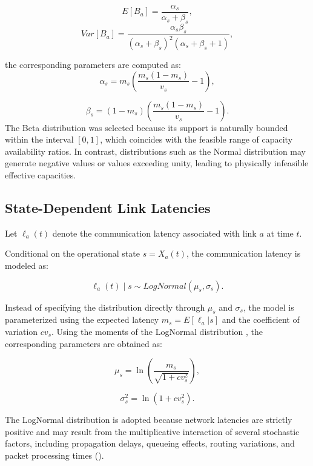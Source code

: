 \documentclass[a4paper,fleqn]{cas-dc}
\begin{document}
\[ E[B_a]=\frac{\alpha_s}{\alpha_s+\beta_s}, \] \[ Var[B_a] = \frac{\alpha_s\beta_s} {(\alpha_s+\beta_s)^2 (\alpha_s+\beta_s+1)}, 
\] 

the corresponding parameters are computed as:
\[ \alpha_s = m_s \left( \frac{m_s(1-m_s)}{v_s}-1 \right), 
\] 

\[ \beta_s = (1-m_s) \left( \frac{m_s(1-m_s)}{v_s}-1 \right). 
\]
The Beta distribution was selected because its support is naturally bounded within the interval \([0,1]\), which coincides with the feasible range of capacity availability ratios. In contrast, distributions such as the Normal distribution may generate negative values or values exceeding unity, leading to physically infeasible effective capacities.

\subsection*{State-Dependent Link Latencies}

Let \(\ell_a(t)\) denote the communication latency associated with link \(a\) at time \(t\). 

Conditional on the operational state \(s=X_a(t)\), the communication latency is modeled as:

\begin{equation} 
\ell_a(t)\mid s 
\sim LogNormal(\mu_s,\sigma_s). 
\end{equation} 

Instead of specifying the distribution directly through \(\mu_s\) and \(\sigma_s\), the model is parameterized using the expected latency \(m_s=E[\ell_a|s]\) and the coefficient of variation \(cv_s\). Using the moments of the LogNormal distribution \citep{Johnson1994}, the corresponding parameters are obtained as:

\begin{equation} 
\mu_s = \ln \left( \frac{m_s} {\sqrt{1+cv_s^2}} \right), 
\end{equation} 

\begin{equation} \sigma_s^2 = \ln(1+cv_s^2). 
\end{equation}

The LogNormal distribution is adopted because network latencies are strictly positive and may result from the multiplicative interaction of several stochastic factors, including propagation delays, queueing effects, routing variations, and packet processing times (\citealp{CrowMiranda2018,Johnson1994}).
\end{document}
